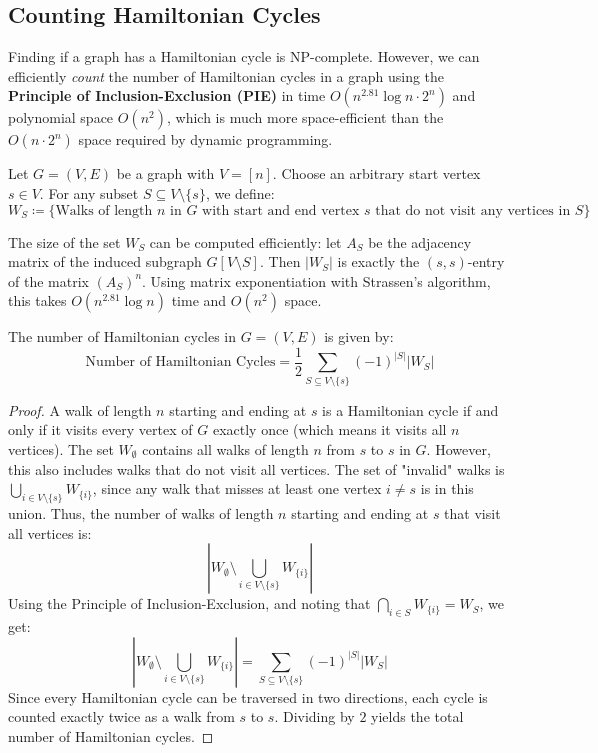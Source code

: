\subsection{Counting Hamiltonian Cycles}

Finding if a graph has a Hamiltonian cycle is NP-complete. However, we can efficiently \textit{count} the number of Hamiltonian cycles in a graph using the \textbf{Principle of Inclusion-Exclusion (PIE)} in time $O(n^{2.81} \log n \cdot 2^n)$ and polynomial space $O(n^2)$, which is much more space-efficient than the $O(n \cdot 2^n)$ space required by dynamic programming.

\begin{definition}
	Let $G = (V, E)$ be a graph with $V = [n]$. Choose an arbitrary start vertex $s \in V$. For any subset $S \subseteq V \setminus \{s\}$, we define:
	$$W_S \coloneqq \{ \text{Walks of length } n \text{ in } G \text{ with start and end vertex } s \text{ that do not visit any vertices in } S \}$$
\end{definition}

\begin{remark}
	The size of the set $W_S$ can be computed efficiently: let $A_S$ be the adjacency matrix of the induced subgraph $G[V \setminus S]$. Then $|W_S|$ is exactly the $(s,s)$-entry of the matrix $(A_S)^n$.
	Using matrix exponentiation with Strassen's algorithm, this takes $O(n^{2.81} \log n)$ time and $O(n^2)$ space.
\end{remark}

\begin{theorem}
	The number of Hamiltonian cycles in $G = (V, E)$ is given by:
	$$\text{Number of Hamiltonian Cycles} = \frac{1}{2} \sum_{S \subseteq V \setminus \{s\}} (-1)^{|S|} |W_S|$$
\end{theorem}

\begin{proof}
	A walk of length $n$ starting and ending at $s$ is a Hamiltonian cycle if and only if it visits every vertex of $G$ exactly once (which means it visits all $n$ vertices).
	The set $W_{\emptyset}$ contains all walks of length $n$ from $s$ to $s$ in $G$. However, this also includes walks that do not visit all vertices. The set of "invalid" walks is $\bigcup_{i \in V \setminus \{s\}} W_{\{i\}}$, since any walk that misses at least one vertex $i \neq s$ is in this union.
	Thus, the number of walks of length $n$ starting and ending at $s$ that visit all vertices is:
	$$\left| W_{\emptyset} \setminus \bigcup_{i \in V \setminus \{s\}} W_{\{i\}} \right|$$
	Using the Principle of Inclusion-Exclusion, and noting that $\bigcap_{i \in S} W_{\{i\}} = W_S$, we get:
	$$\left| W_{\emptyset} \setminus \bigcup_{i \in V \setminus \{s\}} W_{\{i\}} \right| = \sum_{S \subseteq V \setminus \{s\}} (-1)^{|S|} |W_S|$$
	Since every Hamiltonian cycle can be traversed in two directions, each cycle is counted exactly twice as a walk from $s$ to $s$. Dividing by $2$ yields the total number of Hamiltonian cycles.
\end{proof}

